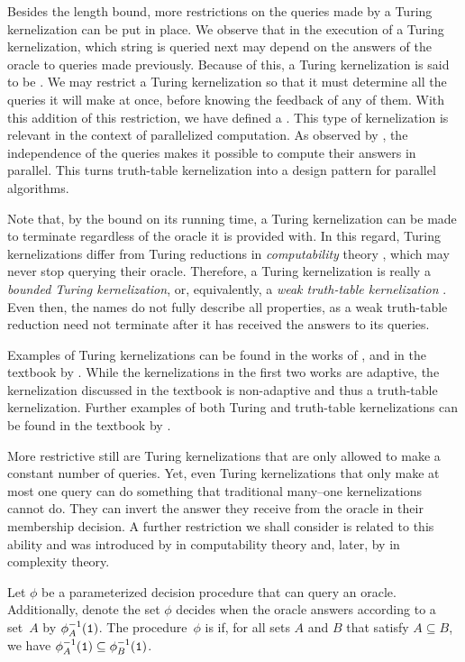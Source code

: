 Besides the length bound, more restrictions on the queries made by a Turing kernelization can be put in place.
We observe that in the execution of a Turing kernelization, which string is queried next may depend on the answers of the oracle to queries made previously.
Because of this, a Turing kernelization is said to be .
We may restrict a Turing kernelization so that it must determine all the queries it will make at once, before knowing the feedback of any of them.
With this addition of this restriction, we have defined a .
This type of kernelization is relevant in the context of parallelized computation.
As observed by \textcite{weller2013aspects}, the independence of the queries makes it possible to compute their answers in parallel.
This turns truth-table kernelization into a design pattern for parallel algorithms.

Note that, by the bound on its running time, a Turing kernelization can be made to terminate regardless of the oracle it is provided with.
In this regard, Turing kernelizations differ from Turing reductions in \emph{computability} theory \parencite{rogers1967theory,odifreddi1992classical}, which may never stop querying their oracle.
Therefore, a Turing kernelization is really a \emph{bounded Turing kernelization}, or, equivalently, a \emph{weak truth-table kernelization} \parencite{odifreddi1992classical} \parencite[see also][Section~2.4.3]{downey2010algorithmic}.
Even then, the names do not fully describe all properties, as a weak truth-table reduction need not terminate after it has received the answers to its queries.

Examples of Turing kernelizations can be found in the works of \textcite{jansen2017turing,thomasse2017polynomial}, and in the textbook by \textcite[Section~9.4]{cygan2015parameterized}.
While the kernelizations in the first two works are adaptive, the kernelization discussed in the textbook is non-adaptive and thus a truth-table kernelization.
Further examples of both Turing and truth-table kernelizations can be found in the textbook by \textcite{fomin2019kernelization}.

More restrictive still are Turing kernelizations that are only allowed to make a constant number of queries.
Yet, even Turing kernelizations that only make at most one query can do something that traditional many--one kernelizations cannot do.
They can invert the answer they receive from the oracle in their membership decision.
A further restriction we shall consider is related to this ability and was introduced by \textcite{jockusch1968semirecursive} in computability theory and, later, by \textcite{selman1982analogues} in complexity theory.
\begin{definition}
  Let $\phi$ be a parameterized decision procedure that can query an oracle.
  Additionally, denote the set $\phi$ decides when the oracle answers according to a set~$A$ by $\phi_A^{-1}(\textnormal{\texttt{1}})$.
  The procedure~$\phi$ is  if, for all sets $A$ and $B$ that satisfy $A \subseteq B$, we have $\phi_A^{-1}(\textnormal{\texttt{1}}) \subseteq \phi_B^{-1}(\textnormal{\texttt{1}})$.
\end{definition}

